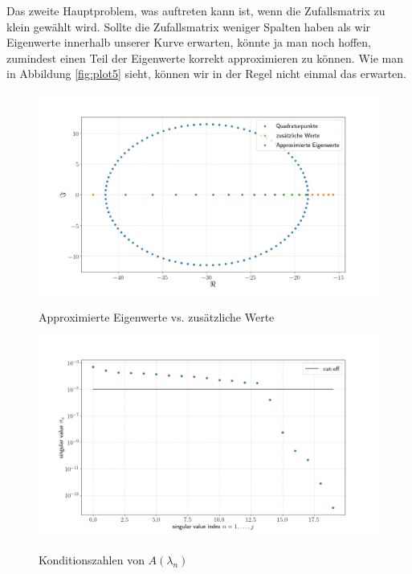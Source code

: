Das zweite Hauptproblem, was auftreten kann ist, wenn die Zufallsmatrix zu klein
gewählt wird. Sollte die Zufallsmatrix weniger Spalten haben als wir
Eigenwerte innerhalb unserer Kurve erwarten, könnte ja man noch hoffen,
zumindest einen Teil der Eigenwerte korrekt approximieren zu können.
Wie man in Abbildung \ref{fig:plot5} sieht, können wir in der Regel nicht
einmal das erwarten.

\begin{figure}
  \caption{Approximierte Eigenwerte vs. zusätzliche Werte}
  \includegraphics[width=\linewidth]{Plots/eigenwerte_complex_plot.png}
  \label{fig:plot1}
\end{figure}

\begin{figure}
  \caption{Konditionszahlen von $A(\lambda_n)$}
  \includegraphics[width=\linewidth]{Plots/singulaerwerte_plot.png}
  \label{fig:plot2}
\end{figure}

